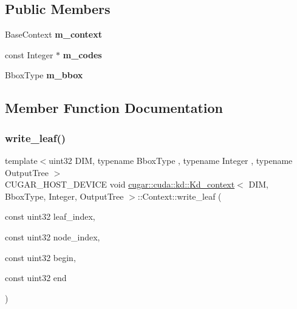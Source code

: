 \subsection*{Public Members}
\begin{DoxyCompactItemize}
\item 
\mbox{\label{structcugar_1_1cuda_1_1kd_1_1_kd__context_1_1_context_a124766fb2813a8a0fcfc7d1115c5cd0a}} 
Base\+Context {\bfseries m\+\_\+context}
\item 
\mbox{\label{structcugar_1_1cuda_1_1kd_1_1_kd__context_1_1_context_ab3063fce2ff33ee780aeed68f8d00c48}} 
const Integer $\ast$ {\bfseries m\+\_\+codes}
\item 
\mbox{\label{structcugar_1_1cuda_1_1kd_1_1_kd__context_1_1_context_abbc1095b788582a1eb47e51d4a758f92}} 
Bbox\+Type {\bfseries m\+\_\+bbox}
\end{DoxyCompactItemize}


\subsection{Member Function Documentation}
\mbox{\label{structcugar_1_1cuda_1_1kd_1_1_kd__context_1_1_context_a6ae8f1b91a2d3d60fcb1d3092e9575de}} 
\subsubsection{\texorpdfstring{write\+\_\+leaf()}{write\_leaf()}}
{\footnotesize\ttfamily template$<$uint32 D\+IM, typename Bbox\+Type , typename Integer , typename Output\+Tree $>$ \\
C\+U\+G\+A\+R\+\_\+\+H\+O\+S\+T\+\_\+\+D\+E\+V\+I\+CE void \hyperlink{structcugar_1_1cuda_1_1kd_1_1_kd__context}{cugar\+::cuda\+::kd\+::\+Kd\+\_\+context}$<$ D\+IM, Bbox\+Type, Integer, Output\+Tree $>$\+::Context\+::write\+\_\+leaf (\begin{DoxyParamCaption}\item[{const uint32}]{leaf\+\_\+index,  }\item[{const uint32}]{node\+\_\+index,  }\item[{const uint32}]{begin,  }\item[{const uint32}]{end }\end{DoxyParamCaption})\hspace{0.3cm}{\ttfamily [inline]}}

